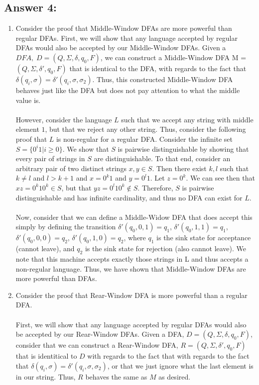 \documentclass[12pt]{article}
\begin{document}
\subsection*{Answer 4:}
\begin{enumerate}
	\item Consider the proof that Middle-Window DFAs are more powerful than regular DFAs. First, we will show that any language accepted by regular DFAs would also be accepted by our Middle-Window DFAs. Given a $DFA, \; D = (Q, \Sigma, \delta, q_0, F)$, we can construct a Middle-Window DFA M = $(Q, \Sigma, \delta ', q_0, F)$ that is identical to the DFA, with regards to the fact that $\delta(q_i, \sigma) = \delta '(q_i, \sigma, \sigma_2)$. Thus, this constructed
	Middle-Window DFA behaves just like the DFA but does not pay attention to what the middle value is. \\\\However, consider the language $L$ such that we accept any string with middle element $1$, but that we reject any other string. Thus, consider the following proof that $L$ is non-regular for a regular DFA. Consider the infinite set $S = \{0^i1 | i \geq 0\}$. We show that $S$ is pairwise distinguishable by showing that every pair of strings in $S$ are distinguishable. To that end, consider an arbitrary pair of two distinct strings $x, y \in S$. Then there exist $k,l$ such that $k \neq l$ and $l > k+1$ and $x = 0^k1$ and $y = 0^l1$. Let $z = 0^k$. We can see then that $xz = 0^k10^k \in S$, but that $yz = 0^l10^k \not \in S$. Therefore, $S$ is pairwise distinguishable and has infinite cardinality, and thus no DFA
	can exist for $L$. \\\\
	Now, consider that we can define a Middle-Widow DFA that does accept this simply by defining the transition $\delta '(q_0, 0, 1) = q_1$, $\delta '(q_0, 1, 1) = q_1$, $\delta '(q_0, 0, 0) = q_2$, $\delta '(q_0, 1, 0) = q_2$, where $q_1$ is the sink state for acceptance (cannot leave), and $q_2$ is the sink state for rejection (also cannot leave). We note that this machine accepts exactly those strings in L and
	thus accepts a non-regular language. Thus, we have shown that Middle-Window DFAs are more powerful than DFAs.
	\item Consider the proof that Rear-Window DFA is more powerful than a regular DFA. \\\\
	First, we will show that any language accepted by regular DFAs would also be accepted by our Rear-Window DFAs. Given a DFA, $D = (Q, \Sigma, \delta, q_0, F)$, consider that we can construct a Rear-Window DFA, $R = (Q, \Sigma, \delta ', q_0, F)$ that is identitical to $D$ with regards to the fact that with regards to the fact that $\delta(q_i, \sigma) = \delta '(q_i, \sigma, \sigma_2)$, or that we just ignore what the last element is in our string. Thus, $R$ behaves the same as $M$ as desired.\\\\

\end{enumerate}
\end{document}
